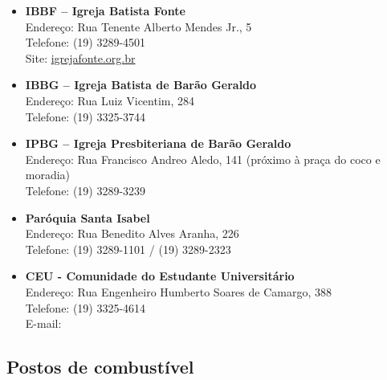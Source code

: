 \begin{itemize}
    \item \textbf{IBBF -- Igreja Batista Fonte}
        \\Endereço: Rua Tenente Alberto Mendes Jr., 5
        \\Telefone: (19) 3289-4501
        \\Site: \url{igrejafonte.org.br}

    \item \textbf{IBBG -- Igreja Batista de Barão Geraldo}
        \\Endereço: Rua Luiz Vicentim, 284
        \\Telefone: (19) 3325-3744

    \item \textbf{IPBG -- Igreja Presbiteriana de Barão Geraldo}
        \\Endereço: Rua Francisco Andreo Aledo, 141 (próximo à praça do coco e
        moradia)
        \\Telefone: (19) 3289-3239

    \item \textbf{Paróquia Santa Isabel}
        \\Endereço: Rua Benedito Alves Aranha, 226
        \\Telefone: (19) 3289-1101 / (19) 3289-2323

    \item \textbf{CEU - Comunidade do Estudante Universitário}
        \\Endereço: Rua Engenheiro Humberto Soares de Camargo, 388
        \\Telefone: (19) 3325-4614
        \\E-mail: 
\end{itemize}

\subsection{Postos de combustível}

